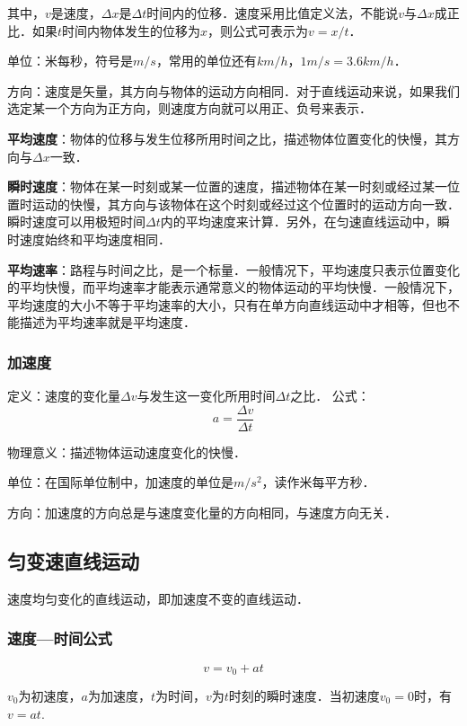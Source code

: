 其中，$v$是速度，$\Delta x$是$\Delta t$时间内的位移．速度采用比值定义法，不能说$v$与$\Delta x$成正比．如果$t$时间内物体发生的位移为$x$，则公式可表示为$v=x/t$．

单位：米每秒，符号是$m/s$，常用的单位还有$km/h$，$1m/s=3.6km/h$．

方向：速度是矢量，其方向与物体的运动方向相同．对于直线运动来说，如果我们选定某一个方向为正方向，则速度方向就可以用正、负号来表示．

\textbf{平均速度}：物体的位移与发生位移所用时间之比，描述物体位置变化的快慢，其方向与$\Delta x$一致．

\textbf{瞬时速度}：物体在某一时刻或某一位置的速度，描述物体在某一时刻或经过某一位置时运动的快慢，其方向与该物体在这个时刻或经过这个位置时的运动方向一致．瞬时速度可以用极短时间$\Delta t$内的平均速度来计算．另外，在匀速直线运动中，瞬时速度始终和平均速度相同．

\textbf{平均速率}：路程与时间之比，是一个标量．一般情况下，平均速度只表示位置变化的平均快慢，而平均速率才能表示通常意义的物体运动的平均快慢．一般情况下，平均速度的大小不等于平均速率的大小，只有在单方向直线运动中才相等，但也不能描述为平均速率就是平均速度．

\subsubsection{加速度}
定义：速度的变化量$\Delta v$与发生这一变化所用时间$\Delta t$之比．
公式：
\begin{equation}
a=\frac{\Delta v}{\Delta t}
\end{equation}

物理意义：描述物体运动速度变化的快慢．

单位：在国际单位制中，加速度的单位是$m/s^2$，读作米每平方秒．

方向：加速度的方向总是与速度变化量的方向相同，与速度方向无关．

\subsection{匀变速直线运动}
速度均匀变化的直线运动，即加速度不变的直线运动．
\subsubsection{速度—时间公式}
\begin{equation}\label{HSPM01_eq1}
v=v_0+at
\end{equation}

$v_0$为初速度，$a$为加速度，$t$为时间，$v$为$t$时刻的瞬时速度．当初速度$v_0=0$时，有$v=at$.

